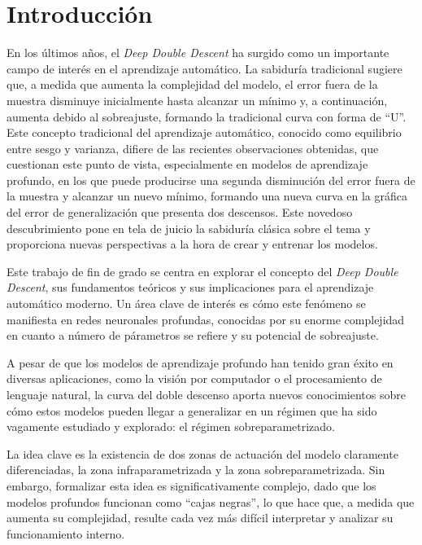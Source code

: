 %


\chapter{Introducción}

En los últimos años, el \emph{Deep Double Descent} ha surgido como un importante campo de interés en el aprendizaje automático. La sabiduría tradicional sugiere que, a medida que aumenta la complejidad del modelo, el error fuera de la muestra disminuye inicialmente hasta alcanzar un mínimo y, a continuación, aumenta debido al sobreajuste, formando la tradicional curva con forma de ``U''. Este concepto tradicional del aprendizaje automático, conocido como equilibrio entre sesgo y varianza, difiere de las recientes observaciones obtenidas, que cuestionan este punto de vista, especialmente en modelos de aprendizaje profundo, en los que puede producirse una segunda disminución del error fuera de la muestra y alcanzar un nuevo mínimo, formando una nueva curva en la gráfica del error de generalización que presenta dos descensos. Este novedoso descubrimiento pone en tela de juicio la sabiduría clásica sobre el tema y proporciona nuevas perspectivas a la hora de crear y entrenar los modelos.\newline

Este trabajo de fin de grado se centra en explorar el concepto del \emph{Deep Double Descent}, sus fundamentos teóricos y sus implicaciones para el aprendizaje automático moderno. Un área clave de interés es cómo este fenómeno se manifiesta en redes neuronales profundas, conocidas por su enorme complejidad en cuanto a número de párametros se refiere y su potencial de sobreajuste.\newline

A pesar de que los modelos de aprendizaje profundo han tenido gran éxito en diversas aplicaciones, como la visión por computador o el procesamiento de lenguaje natural, la curva del doble descenso aporta nuevos conocimientos sobre cómo estos modelos pueden llegar a generalizar en un régimen que ha sido vagamente estudiado y explorado: el régimen sobreparametrizado.\newline

La idea clave es la existencia de dos zonas de actuación del modelo claramente diferenciadas, la zona infraparametrizada y la zona sobreparametrizada. Sin embargo, formalizar esta idea es significativamente complejo, dado que los modelos profundos funcionan como ``cajas negras'', lo que hace que, a medida que aumenta su complejidad, resulte cada vez más difícil interpretar y analizar su funcionamiento interno.\newline


